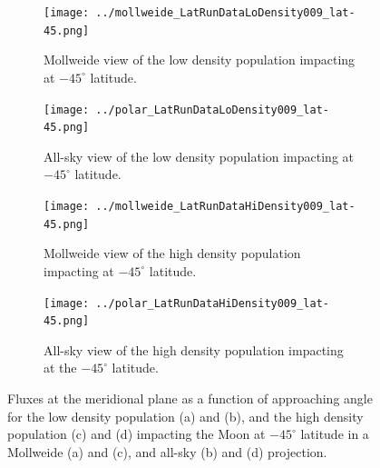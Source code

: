 \documentclass{article}
\begin{document}
\begin{figure}[!htb]
	\begin{subfigure}{.485\textwidth}
		\centering
		\texttt{[image: ../mollweide\_LatRunDataLoDensity009\_lat-45.png]}  
		\caption{Mollweide view of the low density population impacting at $-45^\circ$ latitude.}
		\label{fig:mollweide_LatRunDataLiDensity009_lat-45}
	\end{subfigure}
	\begin{subfigure}{.485\textwidth}
		\centering
		\texttt{[image: ../polar\_LatRunDataLoDensity009\_lat-45.png]}  
		\caption{All-sky view of the low density population impacting at $-45^\circ$ latitude.}
		\label{fig:polar_LatRunDataLoDensity009_lat-45}
	\end{subfigure}
	\newline
	\begin{subfigure}{.485\textwidth}
		\centering
		\texttt{[image: ../mollweide\_LatRunDataHiDensity009\_lat-45.png]}  
		\caption{Mollweide view of the high density population impacting at $-45^\circ$ latitude.}
		\label{fig:mollweide_LatRunDataHiDensity009_lat-45}
	\end{subfigure}
	\begin{subfigure}{.485\textwidth}
		\centering
		\texttt{[image: ../polar\_LatRunDataHiDensity009\_lat-45.png]}  
		\caption{All-sky view of the high density population impacting at the $-45^\circ$ latitude.}
		\label{fig:polar_LatRunDataHiDensity009_lat-45}
	\end{subfigure}
	\caption{Fluxes at the meridional plane as a function of approaching angle for the low density population (a) and (b), and the high density population (c) and (d) impacting the Moon at $-45^\circ$ latitude in a Mollweide (a) and (c), and all-sky (b) and (d) projection.}
	\label{fig:MEM angular dist at 45 deg}
\end{figure}
\end{document}
